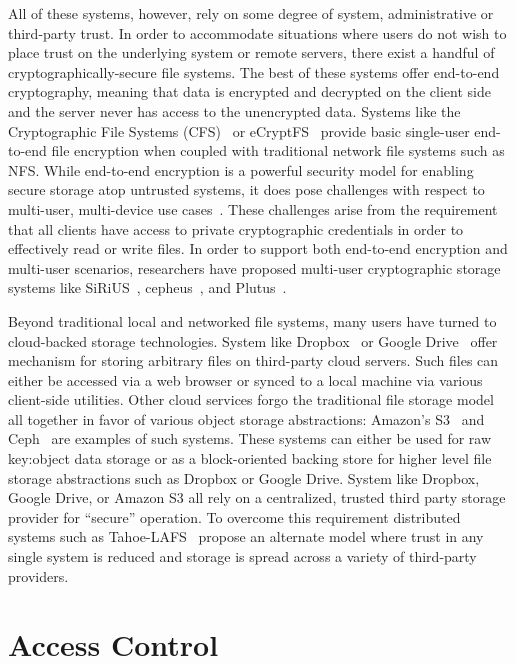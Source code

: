 All of these systems, however, rely on some degree of system,
administrative or third-party trust. In order to accommodate
situations where users do not wish to place trust on the underlying
system or remote servers, there exist a handful of
cryptographically-secure file systems. The best of these systems offer
end-to-end cryptography, meaning that data is encrypted and decrypted
on the client side and the server never has access to the unencrypted
data.  Systems like the Cryptographic File Systems
(CFS)~\cite{blaze1993} or eCryptFS~\cite{ecryptfs} provide basic
single-user end-to-end file encryption when coupled with traditional
network file systems such as NFS. While end-to-end encryption is a
powerful security model for enabling secure storage atop untrusted
systems, it does pose challenges with respect to multi-user,
multi-device use cases~\cite{miltchev2008}. These challenges arise
from the requirement that all clients have access to private
cryptographic credentials in order to effectively read or write
files. In order to support both end-to-end encryption and multi-user
scenarios, researchers have proposed multi-user cryptographic storage
systems like SiRiUS~\cite{goh2003}, cepheus~\cite{fu1998}, and
Plutus~\cite{kallahalla2003}.

Beyond traditional local and networked file systems, many users have
turned to cloud-backed storage technologies. System like
Dropbox~\cite{dropbox} or Google Drive~\cite{google-drive} offer
mechanism for storing arbitrary files on third-party cloud
servers. Such files can either be accessed via a web browser or synced
to a local machine via various client-side utilities. Other cloud
services forgo the traditional file storage model all together in
favor of various object storage abstractions: Amazon's
S3~\cite{amazon-s3} and Ceph~\cite{ceph} are examples of such
systems. These systems can either be used for raw key:object data
storage or as a block-oriented backing store for higher level file
storage abstractions such as Dropbox or Google Drive. System like
Dropbox, Google Drive, or Amazon S3 all rely on a centralized, trusted
third party storage provider for ``secure'' operation. To overcome
this requirement distributed systems such as
Tahoe-LAFS~\cite{wilcox-o'hearn2008} propose an alternate model where
trust in any single system is reduced and storage is spread across a
variety of third-party providers.

\section{Access Control}
\label{chap:background:ac}

